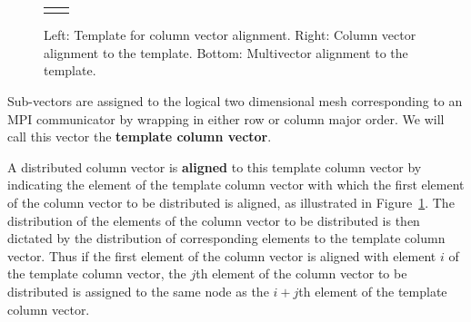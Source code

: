 \begin{figure}[htbp]
\begin{center}
\begin{tabular}{ c c }
{}
\end{tabular}
\end{center}
\caption{Left: Template for column vector alignment.
Right: Column vector alignment to the template.
Bottom: Multivector alignment to the template.}
\label{fig:vecalign}
\end{figure}
Sub-vectors are assigned to the logical two dimensional
mesh corresponding to an MPI communicator
by wrapping in either row or column major order.
We will call this vector the {\bf template column vector}.

A distributed column vector is {\bf aligned} to this template column vector
by indicating the element of the template column vector with which
the first element of the column vector to be distributed is aligned,
as illustrated in Figure~\ref{fig:vecalign}.
The distribution of the elements of the column vector to be distributed
is then dictated by the distribution of corresponding elements
to the template column vector.
Thus if the first element of the column vector is aligned with
element $ i $ of the template column vector,
the $ j $th element of the column vector to be distributed is
assigned to the same node as the $ i+j $th element
of the template column vector.

